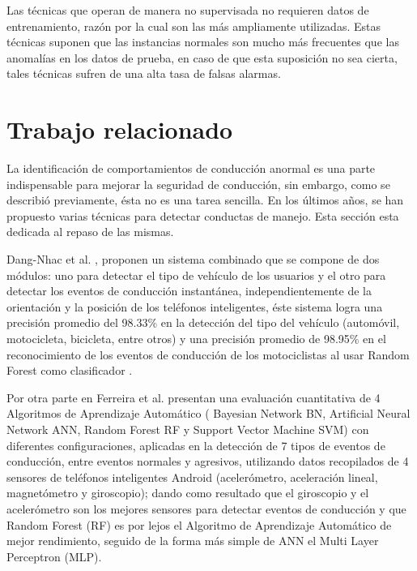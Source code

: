 Las t\'{e}cnicas que operan de manera no supervisada no requieren datos de entrenamiento, raz\'{o}n por la cual son las m\'{a}s ampliamente utilizadas. Estas t\'{e}cnicas suponen que las instancias normales son mucho m\'{a}s frecuentes que  las anomal\'{i}as en los datos de prueba, en caso de que esta suposici\'{o}n no sea cierta, tales t\'{e}cnicas sufren de una alta tasa de falsas alarmas.

\section{Trabajo relacionado}

La identificación de comportamientos de conducción anormal es una parte indispensable para mejorar la seguridad de conducción, sin embargo, como se describi\'{o} previamente, \'{e}sta no es una tarea sencilla. En los últimos años, se han propuesto varias técnicas para detectar conductas de manejo. Esta secci\'{o}n esta dedicada al repaso de las mismas.

\vspace{5mm} %

Dang-Nhac et al. \cite{20}, proponen un sistema combinado que se compone de dos módulos: uno para detectar el tipo de vehículo de los usuarios y el otro para detectar los eventos de conducción instantánea, independientemente de la orientación y la posición de los teléfonos inteligentes, \'{e}ste sistema logra una precisión promedio del 98.33\% en la detección del tipo del vehículo (autom\'{o}vil, motocicleta, bicicleta, entre otros) y una precisión promedio de 98.95\% en el reconocimiento de los eventos de conducción de los motociclistas al usar Random Forest como clasificador .

\vspace{5mm} %

Por otra parte en \cite{21} Ferreira et al. presentan una evaluación cuantitativa de 4 Algoritmos de Aprendizaje Autom\'{a}tico ( Bayesian Network BN, Artificial Neural Network ANN, Random Forest RF y Support Vector Machine SVM) con diferentes configuraciones, aplicadas en la detección de 7 tipos de eventos de conducción, entre eventos normales y agresivos, utilizando datos recopilados de 4 sensores de teléfonos inteligentes Android (acelerómetro, aceleración lineal, magnetómetro y giroscopio); dando como resultado que el giroscopio y el acelerómetro son los mejores sensores para detectar eventos de conducción y que Random Forest (RF) es por lejos el Algoritmo de Aprendizaje Autom\'{a}tico de mejor rendimiento, seguido de la forma m\'{a}s simple de ANN el Multi Layer Perceptron (MLP).

